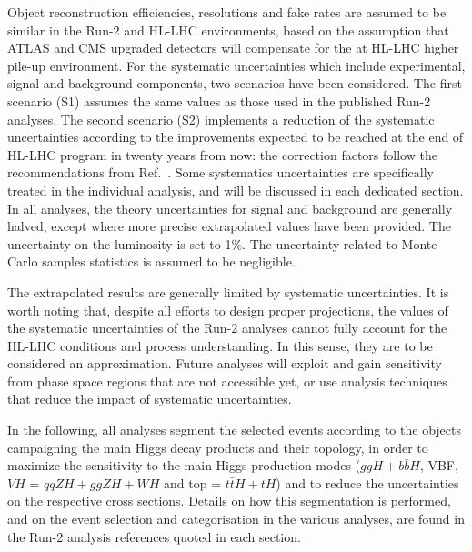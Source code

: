 Object reconstruction efficiencies, resolutions and fake rates are assumed to be similar in the Run-2 and HL-LHC environments, based on the assumption that ATLAS and CMS upgraded detectors will compensate for the at HL-LHC higher pile-up environment.
For the systematic uncertainties which include experimental, signal and background components, two scenarios have been considered.
The first scenario (S1) assumes the same values as those used in the published Run-2 analyses.
The second scenario (S2) implements a reduction of the systematic uncertainties according to the improvements expected to be reached at the end of HL-LHC program in twenty years from now: the correction factors follow the recommendations from Ref.~\cite{HLHELHCCommonSystematics}.
Some systematics uncertainties are specifically treated in the individual analysis, and will be discussed in each dedicated section.
%
In all analyses, the theory uncertainties for signal and background are generally halved, except where more precise extrapolated values have been provided.
The uncertainty on the luminosity is set to 1\%.
The uncertainty related to Monte Carlo samples statistics is assumed to be negligible.

The extrapolated results are generally limited by systematic uncertainties. It is worth noting that, despite all efforts to design proper projections, the values of the systematic uncertainties of the Run-2 analyses cannot fully account for the HL-LHC conditions and process understanding. In this sense, they are to be considered an approximation. Future analyses will exploit and gain sensitivity from phase space regions that are not accessible yet, or use analysis techniques that reduce the impact of systematic uncertainties.

In the following, all analyses segment the selected events according to the objects campaigning the main Higgs decay products and their topology, in order to maximize the sensitivity to the main Higgs production modes ($ggH+b\bar{b}H$, VBF, $VH$ = $qqZH+ggZH+WH$ and top = $t\bar{t}H+tH$)  and to reduce the uncertainties on the respective cross sections. Details on how this segmentation is performed, and on the event selection and categorisation in the various analyses, are found in the Run-2 analysis references quoted in each section.